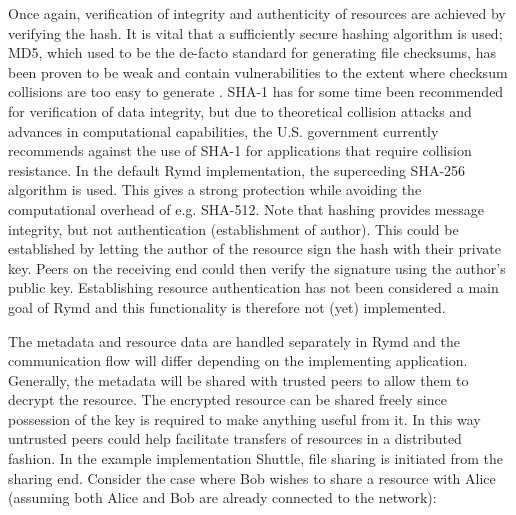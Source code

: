 Once again, verification of integrity and authenticity of resources are achieved by verifying the hash. It is vital that a sufficiently secure hashing algorithm is used; MD5, which used to be the de-facto standard for generating file checksums, has been proven to be weak and contain vulnerabilities to the extent where checksum collisions are too easy to generate \cite{MD5Broken:Online}. SHA-1 has for some time been recommended for verification of data integrity, but due to theoretical collision attacks and advances in computational capabilities, the U.S. government currently recommends against the use of SHA-1 for applications that require collision resistance\cite{NIST:2012}. In the default Rymd implementation, the superceding SHA-256 algorithm is used. This gives a strong protection while avoiding the computational overhead of e.g. SHA-512. Note that hashing provides message integrity, but not authentication (establishment of author). This could be established by letting the author of the resource sign the hash with their private key. Peers on the receiving end could then verify the signature using the author's public key. Establishing resource authentication has not been considered a main goal of Rymd and this functionality is therefore not (yet) implemented.

The metadata and resource data are handled separately in Rymd and the communication flow will differ depending on the implementing application. Generally, the metadata will be shared with trusted peers to allow them to decrypt the resource. The encrypted resource can be shared freely since possession of the key is required to make anything useful from it. In this way untrusted peers could help facilitate transfers of resources in a distributed fashion. In the example implementation Shuttle, file sharing is initiated from the sharing end. Consider the case where Bob wishes to share a resource with Alice (assuming both Alice and Bob are already connected to the network):

